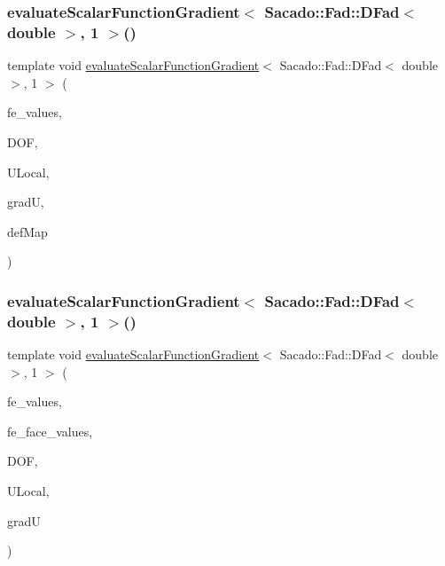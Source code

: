 \subsubsection{\texorpdfstring{evaluate\+Scalar\+Function\+Gradient$<$ Sacado\+::\+Fad\+::\+D\+Fad$<$ double $>$, 1 $>$()}{evaluateScalarFunctionGradient< Sacado::Fad::DFad< double >, 1 >()}\hspace{0.1cm}{\footnotesize\ttfamily [2/4]}}
{\footnotesize\ttfamily template void \mbox{\hyperlink{group___evaluation_functions_gabedd4ae2841d2332ed0df0513b189e34}{evaluate\+Scalar\+Function\+Gradient}}$<$ Sacado\+::\+Fad\+::\+D\+Fad$<$ double $>$, 1 $>$ (\begin{DoxyParamCaption}\item[{const F\+E\+Values$<$ 1 $>$ \&}]{fe\+\_\+values,  }\item[{unsigned int}]{D\+OF,  }\item[{Table$<$ 1, Sacado\+::\+Fad\+::\+D\+Fad$<$ double $>$$>$ \&}]{U\+Local,  }\item[{Table$<$ 2, Sacado\+::\+Fad\+::\+D\+Fad$<$ double $>$$>$ \&}]{gradU,  }\item[{\mbox{\hyperlink{structdeformation_map}{deformation\+Map}}$<$ Sacado\+::\+Fad\+::\+D\+Fad$<$ double $>$, 1 $>$ \&}]{def\+Map }\end{DoxyParamCaption})}

\mbox{\label{function_evaluations_8cc_a4a0fd4f75bf25ccf08f6da45df20d5a7}} 
\subsubsection{\texorpdfstring{evaluate\+Scalar\+Function\+Gradient$<$ Sacado\+::\+Fad\+::\+D\+Fad$<$ double $>$, 1 $>$()}{evaluateScalarFunctionGradient< Sacado::Fad::DFad< double >, 1 >()}\hspace{0.1cm}{\footnotesize\ttfamily [3/4]}}
{\footnotesize\ttfamily template void \mbox{\hyperlink{group___evaluation_functions_gabedd4ae2841d2332ed0df0513b189e34}{evaluate\+Scalar\+Function\+Gradient}}$<$ Sacado\+::\+Fad\+::\+D\+Fad$<$ double $>$, 1 $>$ (\begin{DoxyParamCaption}\item[{const F\+E\+Values$<$ 1 $>$ \&}]{fe\+\_\+values,  }\item[{const F\+E\+Face\+Values$<$ 1 $>$ \&}]{fe\+\_\+face\+\_\+values,  }\item[{unsigned int}]{D\+OF,  }\item[{Table$<$ 1, Sacado\+::\+Fad\+::\+D\+Fad$<$ double $>$$>$ \&}]{U\+Local,  }\item[{Table$<$ 2, Sacado\+::\+Fad\+::\+D\+Fad$<$ double $>$$>$ \&}]{gradU }\end{DoxyParamCaption})}

